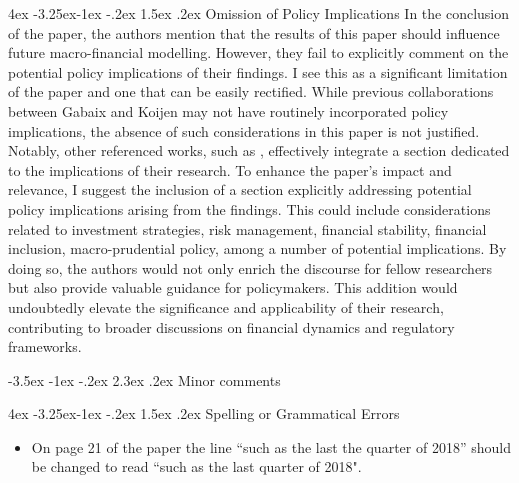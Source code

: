 \documentclass[]{article}
\makeatletter
\renewcommand\section{\leftskip 0pt\@startsection {section}{1}{\z@}%
	{-3.5ex \@plus -1ex \@minus -.2ex}%
	{2.3ex \@plus.2ex}%
	{\normalfont\Large\bfseries}}
\renewcommand\subsection{\leftskip 4ex\@startsection{subsection}{2}{\z@}%
	{-3.25ex\@plus -1ex \@minus -.2ex}%
	{1.5ex \@plus .2ex}%
	{\normalfont\large\bfseries}}
\makeatother
\begin{document}
\begin{spacing}{1.25}
	
	\subsection{Omission of Policy Implications}
	In the conclusion of the paper, the authors mention that the results of this paper should influence future macro-financial modelling. However, they fail to explicitly comment on the potential policy implications of their findings. I see this as a significant limitation of the paper and one that can be easily rectified. While previous collaborations between Gabaix and Koijen may not have routinely incorporated policy implications, the absence of such considerations in this paper is not justified. Notably, other referenced works, such as \cite{haddad2021competitive}, effectively integrate a section dedicated to the implications of their research. To enhance the paper's impact and relevance, I suggest the inclusion of a section explicitly addressing potential policy implications arising from the findings.  This could include considerations related to investment strategies, risk management, financial stability, financial inclusion, macro-prudential policy, among a number of potential implications. By doing so, the authors would not only enrich the discourse for fellow researchers but also provide valuable guidance for policymakers. This addition would undoubtedly elevate the significance and applicability of their research, contributing to broader discussions on financial dynamics and regulatory frameworks. 
	
	


\section{Minor comments}



	\subsection{Spelling or Grammatical Errors}
		\begin{itemize}[leftmargin=10ex]
			\item On page 21 of the paper the line ``such as the last the quarter of 2018'' should be changed to read ``such as the last quarter of 2018".
		\end{itemize}
		

\end{spacing}
\end{document}
